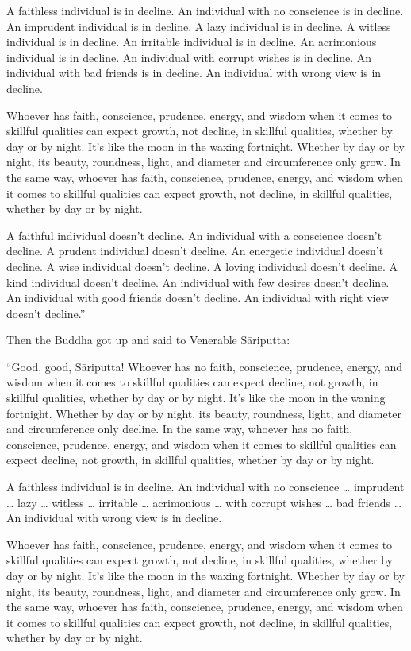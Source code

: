 \documentclass[12pt,openany]{book}%
\begin{document}
A faithless individual is in decline. An individual with no conscience is in decline. An imprudent individual is in decline. A lazy individual is in decline. A witless individual is in decline. An irritable individual is in decline. An acrimonious individual is in decline. An individual with corrupt wishes is in decline. An individual with bad friends is in decline. An individual with wrong view is in decline. 

Whoever has faith, conscience, prudence, energy, and wisdom when it comes to skillful qualities can expect growth, not decline, in skillful qualities, whether by day or by night. It’s like the moon in the waxing fortnight. Whether by day or by night, its beauty, roundness, light, and diameter and circumference only grow. In the same way, whoever has faith, conscience, prudence, energy, and wisdom when it comes to skillful qualities can expect growth, not decline, in skillful qualities, whether by day or by night. 

A faithful individual doesn’t decline. An individual with a conscience doesn’t decline. A prudent individual doesn’t decline. An energetic individual doesn’t decline. A wise individual doesn’t decline. A loving individual doesn’t decline. A kind individual doesn’t decline. An individual with few desires doesn’t decline. An individual with good friends doesn’t decline. An individual with right view doesn’t decline.” 

Then the Buddha got up and said to Venerable \textsanskrit{Sāriputta}: 

“Good, good, \textsanskrit{Sāriputta}! Whoever has no faith, conscience, prudence, energy, and wisdom when it comes to skillful qualities can expect decline, not growth, in skillful qualities, whether by day or by night. It’s like the moon in the waning fortnight. Whether by day or by night, its beauty, roundness, light, and diameter and circumference only decline. In the same way, whoever has no faith, conscience, prudence, energy, and wisdom when it comes to skillful qualities can expect decline, not growth, in skillful qualities, whether by day or by night. 

A faithless individual is in decline. An individual with no conscience … imprudent … lazy … witless … irritable … acrimonious … with corrupt wishes … bad friends … An individual with wrong view is in decline. 

Whoever has faith, conscience, prudence, energy, and wisdom when it comes to skillful qualities can expect growth, not decline, in skillful qualities, whether by day or by night. It’s like the moon in the waxing fortnight. Whether by day or by night, its beauty, roundness, light, and diameter and circumference only grow. In the same way, whoever has faith, conscience, prudence, energy, and wisdom when it comes to skillful qualities can expect growth, not decline, in skillful qualities, whether by day or by night. 
\end{document}
